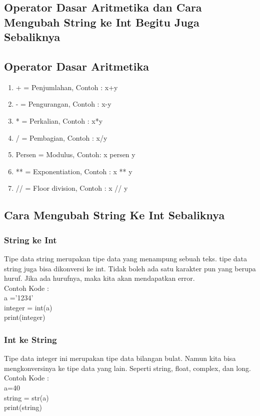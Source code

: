 \subsection{Operator Dasar Aritmetika dan Cara Mengubah String ke Int Begitu Juga Sebaliknya}
\subsection{Operator Dasar Aritmetika}
\begin{enumerate}
\item + = Penjumlahan, Contoh : x+y\\
\item - = Pengurangan, Contoh : x-y\\
\item * = Perkalian, Contoh : x*y\\
\item / = Pembagian, Contoh : x/y\\
\item Persen = Modulus, Contoh:	x persen y\\
\item ** = Exponentiation, Contoh :	x ** y\\
\item // = Floor division, Contoh :	x // y\\
\end{enumerate}
\subsection{Cara Mengubah String Ke Int Sebaliknya}
\subsubsection{String ke Int}
Tipe data string merupakan tipe data yang menampung sebuah teks. tipe data string juga bisa dikonversi ke int. Tidak boleh ada satu karakter pun yang berupa huruf. Jika ada hurufnya, maka kita akan mendapatkan error. \\
Contoh Kode :\\
a ='1234' \\
integer = int(a)\\
print(integer)\\

\subsubsection{Int ke String}
Tipe data integer ini merupakan tipe data bilangan bulat. Namun kita bisa mengkonversinya ke tipe data yang lain. Seperti string, float, complex, dan long.\\ Contoh Kode :\\
a=40\\
string = str(a)\\
print(string)\\

